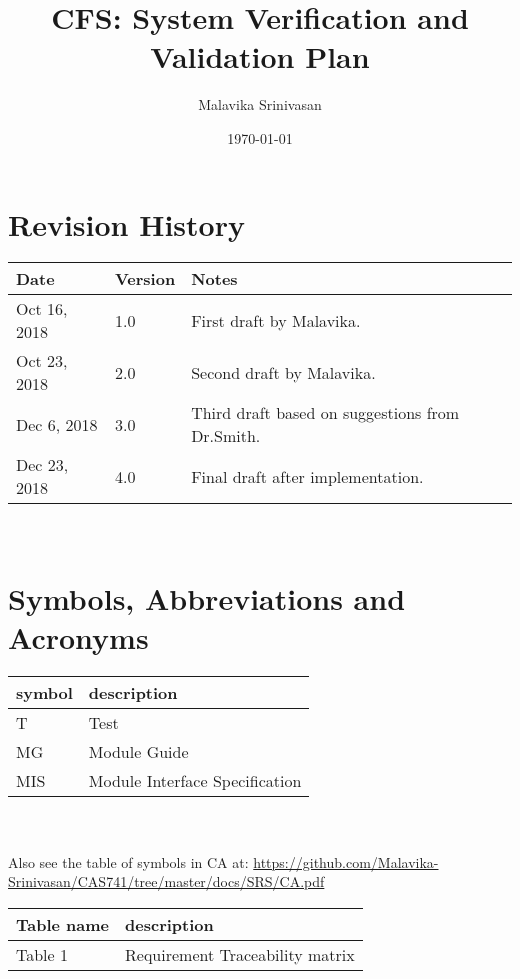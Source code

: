 \documentclass[12pt, titlepage]{article}
\begin{document}
\title{CFS: System Verification and Validation Plan
} 
\author{Malavika Srinivasan}
\date{\today}
	
\maketitle



\section{Revision History}

\begin{tabularx}{\textwidth}{p{3cm}p{2cm}X}
\toprule {\bf Date} & {\bf Version} & {\bf Notes}\\
\midrule
Oct 16, 2018 & 1.0 & First draft by Malavika.\\
Oct 23, 2018 & 2.0 & Second draft by Malavika.\\
Dec 6, 2018 & 3.0 & Third draft based on suggestions from Dr.Smith.\\
Dec 23, 2018 & 4.0 & Final draft after implementation.\\

\bottomrule
\end{tabularx}

~\newpage

\section{Symbols, Abbreviations and Acronyms}
\renewcommand{\arraystretch}{1.2}
\begin{tabular}{l l} 
	\toprule		
	\textbf{symbol} & \textbf{description}\\
	\midrule 
	T & Test\\
	MG & Module Guide\\
	MIS & Module Interface Specification\\
	\bottomrule
\end{tabular}\\
\\
Also see the table of symbols in CA at: 
\url{https://github.com/Malavika-Srinivasan/CAS741/tree/master/docs/SRS/CA.pdf}\\


\newpage

\tableofcontents

\listoftables

\renewcommand{\arraystretch}{1.2}
\begin{tabular}{l l} 
	\toprule		
	\textbf{Table name} & \textbf{description}\\
	\midrule 
	Table 1 & Requirement Traceability matrix\\
	\bottomrule
\end{tabular}\\
\end{document}
